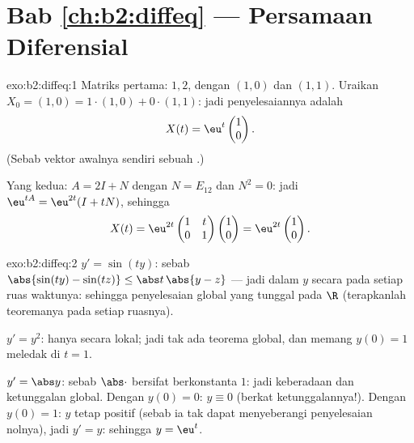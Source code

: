 \section*{Bab \ref{ch:b2:diffeq} --- Persamaan Diferensial}

\begin{solution}{exo:b2:diffeq:1}
Matriks pertama:  $1, 2$, dengan  $(1,0)$ dan $(1,1)$.
Uraikan $X_0 = (1,0) = 1\cdot(1,0) + 0\cdot(1,1)$: jadi penyelesaiannya
adalah
\[
X(t) = \eu^{t}\begin{pmatrix}1\\ 0\end{pmatrix} .
\]
(Sebab vektor awalnya sendiri sebuah .)

Yang kedua: $A = 2I + N$ dengan $N = E_{12}$ dan $N^2 = 0$: jadi $\eu^{tA} =
\eu^{2t}(I + tN)$, sehingga
\[
X(t) = \eu^{2t}\begin{pmatrix} 1 & t\\ 0 & 1\end{pmatrix}
\begin{pmatrix}1\\ 0\end{pmatrix}
= \eu^{2t}\begin{pmatrix}1\\ 0\end{pmatrix}.
\]
\end{solution}

\begin{solution}{exo:b2:diffeq:2}
$y' = \sin(ty)$: sebab $\abs{\sin(ty) - \sin(tz)} \leq \abs t\,\abs{y -
z}$ --- jadi  dalam $y$ secara  pada setiap ruas waktunya:
sehingga penyelesaian global yang tunggal pada $\R$ (terapkanlah teoremanya pada setiap
ruasnya).

$y' = y^2$: hanya  secara lokal; jadi tak ada teorema global, dan memang
$y(0) = 1$ meledak di $t = 1$.

$y' = \abs y$: sebab $\abs\cdot$ bersifat  berkonstanta $1$: jadi keberadaan dan
ketunggalan global. Dengan $y(0) = 0$: $y \equiv 0$ (berkat ketunggalannya!). Dengan $y(0)
= 1$: $y$ tetap positif (sebab ia tak dapat menyeberangi penyelesaian nolnya), jadi $y' =
y$: sehingga $y = \eu^t$.
\end{solution}

